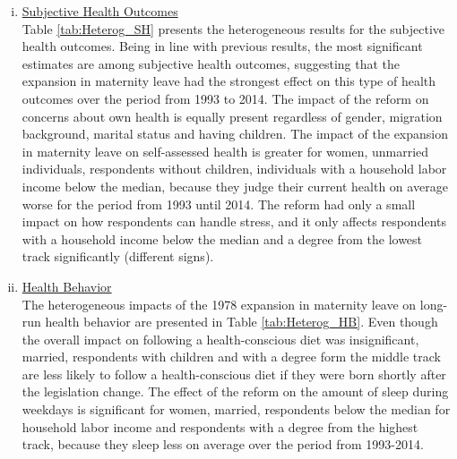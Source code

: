 \documentclass[a4paper ]{article}
\begin{document}
\begin{enumerate}[(i)]
\item \underline{Subjective Health Outcomes}\\ Table \ref{tab:Heterog_SH} presents the heterogeneous results for the subjective health outcomes. Being in line with previous results, the most significant estimates are among subjective health outcomes, suggesting that the expansion in maternity leave had the strongest effect on this type of health outcomes over the period from 1993 to 2014.\newline
The impact of the reform on concerns about own health is equally present regardless of gender, migration background, marital status and having children. The impact of the expansion in maternity leave on self-assessed health is greater for women, unmarried individuals, respondents without children, individuals with a household labor income below the median, because they judge their current health on average worse for the period from 1993 until 2014. The reform had only a small impact on how respondents can handle stress, and it only affects respondents with a household income below the median and a degree from the lowest track significantly (different signs).

\item \underline{Health Behavior}\\
The heterogeneous impacts of the 1978 expansion in maternity leave on long-run health behavior are presented in Table \ref{tab:Heterog_HB}. Even though the overall impact on following a health-conscious diet was insignificant, married, respondents with children and with a degree form the middle track are less likely to follow a health-conscious diet if they were born shortly after the legislation change. The effect of the reform on the amount of sleep during weekdays is significant for women, married, respondents below the median for household labor income and respondents with a degree from the highest track, because they sleep less on average over the period from 1993-2014. 
\end{enumerate}
\end{document}
